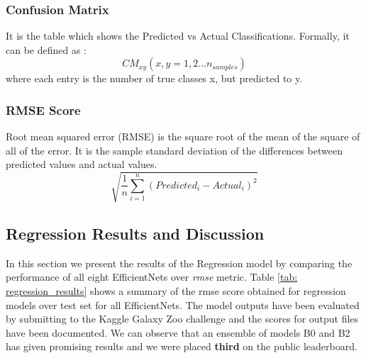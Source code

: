 \documentclass[fleqn,usenatbib]{mnras}
\begin{document}
\subsubsection{Confusion Matrix}
\hspace*{0.25 in} It is the table which shows the Predicted vs Actual Classifications. Formally, it can be defined as :
\begin{equation}
CM_{xy}(x,y=1,2...n_{samples})
\end{equation}
where each entry is the number of true classes x, but predicted to y.

\subsubsection{RMSE Score}
\hspace*{0.25 in} Root mean squared error (RMSE) is the square root of the mean of the square of all of the error. It is the sample standard deviation of the differences between predicted values and actual values.
\begin{equation}
\sqrt{\frac{ 1 }{ n } \sum_{ i = 1 } ^ { n } ( Predicted_{i}-Actual_{i} ) ^ 2 }
\end{equation}

\subsection{Regression Results and Discussion}
\hspace*{0.25 in}In this section we present the results of the Regression model by comparing the performance of all eight EfficientNets over \textit{rmse} metric. Table \ref{tab: regression_results} shows a summary of the rmse score obtained for regression models over test set for all EfficientNets.
The model outputs have been evaluated by submitting to the Kaggle Galaxy Zoo challenge and the scores for output files have been documented. We can observe that an ensemble of models B0 and B2 has given promising results and we were placed \textbf{third} on the public leaderboard.
\begin{center}
    
\end{center}
\end{document}
